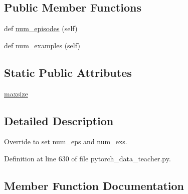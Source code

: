 \subsection*{Public Member Functions}
\begin{DoxyCompactItemize}
\item 
def \hyperlink{classparlai_1_1core_1_1pytorch__data__teacher_1_1ParlAIConcatDataset_a17a0c832fe97e4ab80906ba691d85ba3}{num\+\_\+episodes} (self)
\item 
def \hyperlink{classparlai_1_1core_1_1pytorch__data__teacher_1_1ParlAIConcatDataset_a18b104ac4b013780a973cf8655b8406a}{num\+\_\+examples} (self)
\end{DoxyCompactItemize}
\subsection*{Static Public Attributes}
\begin{DoxyCompactItemize}
\item 
\hyperlink{classparlai_1_1core_1_1pytorch__data__teacher_1_1ParlAIConcatDataset_a431fa0b54c4f0d63911c8bcaf73b8ffc}{maxsize}
\end{DoxyCompactItemize}


\subsection{Detailed Description}
\begin{DoxyVerb}Override to set num_eps and num_exs.
\end{DoxyVerb}
 

Definition at line 630 of file pytorch\+\_\+data\+\_\+teacher.\+py.



\subsection{Member Function Documentation}
\mbox{\label{classparlai_1_1core_1_1pytorch__data__teacher_1_1ParlAIConcatDataset_a17a0c832fe97e4ab80906ba691d85ba3}} 
